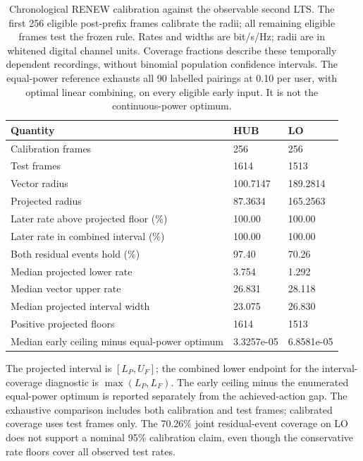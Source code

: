\documentclass[10pt,letterpaper]{article}
\begin{document}
\begin{table}[htbp]\centering\small
\setlength{\tabcolsep}{4pt}
\caption{Chronological RENEW calibration against the observable second LTS. The first 256 eligible post-prefix frames calibrate the radii; all remaining eligible frames test the frozen rule. Rates and widths are bit/s/Hz; radii are in whitened digital channel units. Coverage fractions describe these temporally dependent recordings, without binomial population confidence intervals. The equal-power reference exhausts all 90 labelled pairings at 0.10 per user, with optimal linear combining, on every eligible early input. It is not the continuous-power optimum.}\label{supp:hardware_calibration}
\begin{tabular}{lll}\toprule
Quantity & HUB & LO\\
\midrule
Calibration frames & 256 & 256\\
Test frames & 1614 & 1513\\
Vector radius & 100.7147 & 189.2814\\
Projected radius & 87.3634 & 165.2563\\
Later rate above projected floor (\%) & 100.00 & 100.00\\
Later rate in combined interval (\%) & 100.00 & 100.00\\
Both residual events hold (\%) & 97.40 & 70.26\\
Median projected lower rate & 3.754 & 1.292\\
Median vector upper rate & 26.831 & 28.118\\
Median projected interval width & 23.075 & 26.830\\
Positive projected floors & 1614 & 1513\\
Median early ceiling minus equal-power optimum & 3.3257e-05 & 6.8581e-05\\
\bottomrule\end{tabular}
\end{table}
The projected interval is $[L_P,U_F]$; the combined lower endpoint for the interval-coverage diagnostic is $\max(L_P,L_F)$. The early ceiling minus the enumerated equal-power optimum is reported separately from the achieved-action gap. The exhaustive comparison includes both calibration and test frames; calibrated coverage uses test frames only. The 70.26\% joint residual-event coverage on LO does not support a nominal 95\% calibration claim, even though the conservative rate floors cover all observed test rates.
\end{document}
